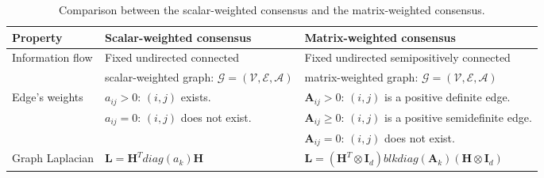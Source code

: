 \documentclass[draftclsnofoot,11pt,onecolumn]{IEEEtran}
\newcommand{\m}[1]{\mathbf{#1}}
\newcommand{\mc}[1]{\mathcal{#1}}
\begin{document}
\begin{table*}[h!]
\centering
\caption{Comparison between the scalar-weighted consensus and the matrix-weighted consensus.} \label{table:1}
\begin{tabular}{|l|l|l|}
        \hline
        Property                                     & Scalar-weighted consensus                                & Matrix-weighted consensus                                                                                             \\ \hline
        Information flow                             & Fixed undirected connected                               & Fixed undirected semipositively connected                                                                             \\ 
        ~                                            & scalar-weighted graph: $\mc{G} = (\mc{V},\mc{E},\mc{A})$ & matrix-weighted graph: $\mc{G} = (\mc{V},\mc{E},\mc{A})$                                                              \\ \hline
        Edge's weights                               & $a_{ij}>0$: $(i,j)$ exists.                                & $\m{A}_{ij}>0$: $(i,j)$ is a positive definite edge.                                                                        \\ 
        ~                                            & $a_{ij}=0$: $(i,j)$ does not exist.                        & $\m{A}_{ij}\geq 0$: $(i,j)$ is a positive semidefinite edge.                                                                \\ 
        ~                                            & ~                                                        & $\m{A}_{ij} = 0$: $(i,j)$ does not exist.                                                                                   \\ \hline
        Graph Laplacian                            & $\m{L} = \m{H}^T diag(a_k) \m{H}$                        & $\m{L} = (\m{H}^T \otimes \m{I}_d) blkdiag(\m{A}_k) (\m{H} \otimes \m{I}_d)$                                                                                                

\end{tabular}
\end{table*}
\end{document}
